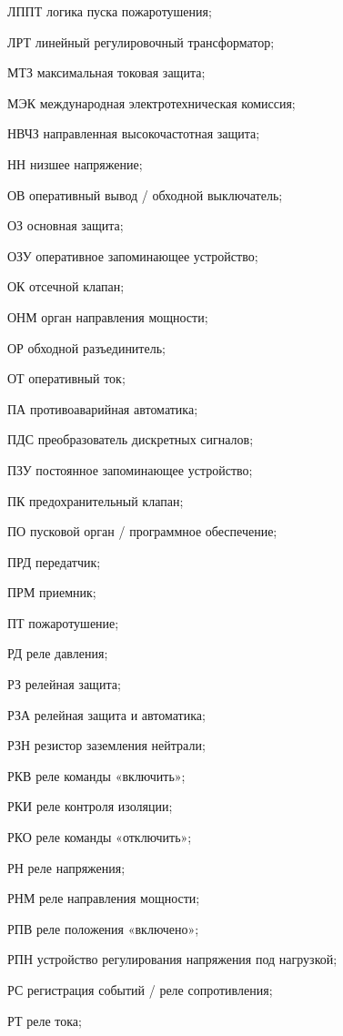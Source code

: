 \begin{list}{}
\item[ЛППТ] логика пуска пожаротушения;
\item[ЛРТ] линейный регулировочный трансформатор;
\item[МТЗ] максимальная токовая защита;
\item[МЭК] международная электротехническая комиссия;
\item[НВЧЗ] направленная высокочастотная защита;
\item[НН] низшее напряжение;
\item[ОВ] оперативный вывод / обходной выключатель;
\item[ОЗ] основная защита;
\item[ОЗУ] оперативное запоминающее устройство;
\item[ОК] отсечной клапан;
\item[ОНМ] орган направления мощности;
\item[ОР] обходной разъединитель;
\item[ОТ] оперативный ток;
\item[ПА] противоаварийная автоматика;
\item[ПДС] преобразователь дискретных сигналов;
\item[ПЗУ] постоянное запоминающее устройство;
\item[ПК] предохранительный клапан;
\item[ПО] пусковой орган / программное обеспечение;
\item[ПРД] передатчик;
\item[ПРМ] приемник;
\item[ПТ] пожаротушение;
\item[РД] реле давления;
\item[РЗ] релейная защита;
\item[РЗА] релейная защита и автоматика;
\item[РЗН] резистор заземления нейтрали;
\item[РКВ] реле команды «включить»;
\item[РКИ] реле контроля изоляции;
\item[РКО] реле команды «отключить»;
\item[РН] реле напряжения;
\item[РНМ] реле направления мощности;
\item[РПВ] реле положения «включено»;
\item[РПН] устройство регулирования напряжения под нагрузкой;
\item[РС] регистрация событий / реле сопротивления;
\item[РТ] реле тока;

\end{list}
